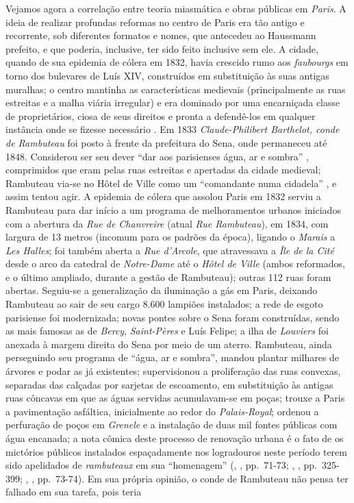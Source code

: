 Vejamos agora a correlação entre teoria miasmática e obras públicas em \textit{Paris}. A ideia de realizar profundas reformas no centro de Paris era tão antigo e recorrente, sob diferentes formatos e nomes, que antecedeu ao Haussmann prefeito, e que poderia, inclusive, ter sido feito inclusive sem ele. A cidade, quando de sua epidemia de cólera em 1832, havia crescido rumo aos \textit{faubourgs} em torno dos bulevares de Luís XIV, construídos em substituição às suas antigas muralhas; o centro mantinha as características medievais (principalmente as ruas estreitas e a malha viária irregular) e era dominado por uma encarniçada classe de proprietários, ciosa de seus direitos e pronta a defendê-los em qualquer instância onde se fizesse necessário \cite{faure_paris_2004}. Em 1833 \textit{Claude-Philibert Barthelot, conde de Rambuteau} foi posto à frente da prefeitura do Sena, onde permaneceu até 1848. Considerou ser seu dever ``dar aos parisienses água, ar e sombra'' \cite[p.~269]{rambuteau1905memoires}, comprimidos que eram pelas ruas estreitas e apertadas da cidade medieval; Rambuteau via-se no Hôtel de Ville como um ``comandante numa cidadela'' \cite[p.~269]{rambuteau1905memoires}, e assim tentou agir. A epidemia de cólera que assolou Paris em 1832 serviu a Rambuteau para dar início a um programa de melhoramentos urbanos iniciados com a abertura da \textit{Rue de Chanvreire} (atual \textit{Rue Rambuteau}), em 1834, com largura de 13 metros (incomum para os padrões da época), ligando o \textit{Marais} a \textit{Les Halles}; foi também aberta a \textit{Rue d'Arcole}, que atravessava a \textit{Île de la Cité} desde o arco da catedral de \textit{Notre-Dame} até o \textit{Hôtel de Ville} (ambos reformados, e o último ampliado, durante a gestão de Rambuteau); outras 112 ruas foram abertas. Seguiu-se a generalização da iluminação a gás em Paris, deixando Rambuteau ao sair de seu cargo 8.600 lampiões instalados; a rede de esgoto parisiense foi modernizada; novas pontes sobre o Sena foram construídas, sendo as mais famosas as de \textit{Bercy}, \textit{Saint-Pères} e Luís Felipe; a ilha de \textit{Louviers} foi anexada à margem direita do Sena por meio de um aterro. Rambuteau, ainda perseguindo seu programa de ``água, ar e sombra'', mandou plantar milhares de árvores e podar as já existentes; supervisionou a proliferação das ruas convexas, separadas das calçadas por sarjetas de escoamento, em substituição às antigas ruas côncavas em que as águas servidas acumulavam-se em poças; trouxe a Paris a pavimentação asfáltica, inicialmente ao redor do \textit{Palais-Royal}; ordenou a perfuração de poços em \textit{Grenele} e a instalação de duas mil fontes públicas com água encanada; a nota cômica deste processo de renovação urbana é o fato de os mictórios públicos instalados espaçadamente nos logradouros neste período terem sido apelidados de \textit{rambuteaux} em sua ``homenagem'' (\citeauthor{combeau_paris_2011}, \citeyear{combeau_paris_2011}, pp.~71-73; \citeauthor{rambuteau1905memoires}, \citeyear{rambuteau1905memoires}, pp.~325-399; \citeauthor{petti_eurfranba_2011}, \citeyear{petti_eurfranba_2011}, pp.~73-74). Em sua própria opinião, o conde de Rambuteau não pensa ter falhado em sua tarefa, pois teria 
